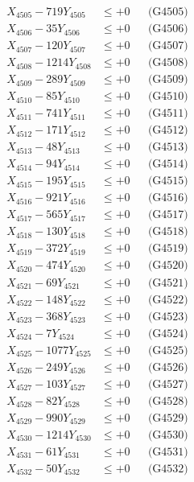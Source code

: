 \documentclass[a4paper,10pt]{article}
\begin{document}
{\begin{align}
X_{4505} - 719Y_{4505} &\leq +0 && \text{(G4505)} \\
X_{4506} - 35Y_{4506} &\leq +0 && \text{(G4506)} \\
X_{4507} - 120Y_{4507} &\leq +0 && \text{(G4507)} \\
X_{4508} - 1214Y_{4508} &\leq +0 && \text{(G4508)} \\
X_{4509} - 289Y_{4509} &\leq +0 && \text{(G4509)} \\
X_{4510} - 85Y_{4510} &\leq +0 && \text{(G4510)} \\
\allowbreak
X_{4511} - 741Y_{4511} &\leq +0 && \text{(G4511)} \\
X_{4512} - 171Y_{4512} &\leq +0 && \text{(G4512)} \\
X_{4513} - 48Y_{4513} &\leq +0 && \text{(G4513)} \\
X_{4514} - 94Y_{4514} &\leq +0 && \text{(G4514)} \\
X_{4515} - 195Y_{4515} &\leq +0 && \text{(G4515)} \\
X_{4516} - 921Y_{4516} &\leq +0 && \text{(G4516)} \\
X_{4517} - 565Y_{4517} &\leq +0 && \text{(G4517)} \\
X_{4518} - 130Y_{4518} &\leq +0 && \text{(G4518)} \\
X_{4519} - 372Y_{4519} &\leq +0 && \text{(G4519)} \\
X_{4520} - 474Y_{4520} &\leq +0 && \text{(G4520)} \\
\allowbreak
X_{4521} - 69Y_{4521} &\leq +0 && \text{(G4521)} \\
X_{4522} - 148Y_{4522} &\leq +0 && \text{(G4522)} \\
X_{4523} - 368Y_{4523} &\leq +0 && \text{(G4523)} \\
X_{4524} - 7Y_{4524} &\leq +0 && \text{(G4524)} \\
X_{4525} - 1077Y_{4525} &\leq +0 && \text{(G4525)} \\
X_{4526} - 249Y_{4526} &\leq +0 && \text{(G4526)} \\
X_{4527} - 103Y_{4527} &\leq +0 && \text{(G4527)} \\
X_{4528} - 82Y_{4528} &\leq +0 && \text{(G4528)} \\
X_{4529} - 990Y_{4529} &\leq +0 && \text{(G4529)} \\
X_{4530} - 1214Y_{4530} &\leq +0 && \text{(G4530)} \\
\allowbreak
X_{4531} - 61Y_{4531} &\leq +0 && \text{(G4531)} \\
X_{4532} - 50Y_{4532} &\leq +0 && \text{(G4532)} \\

\end{align}}
\end{document}
